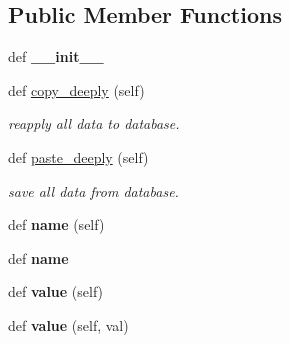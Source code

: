 \subsection*{Public Member Functions}
\begin{DoxyCompactItemize}
\item 
def {\bfseries \+\_\+\+\_\+init\+\_\+\+\_\+}\hypertarget{classplume-creator_1_1src_1_1plume_1_1gui_1_1property_1_1_property_ac6cc8e04a1c280a6d8c0b5bd5d85ffd2}{}\label{classplume-creator_1_1src_1_1plume_1_1gui_1_1property_1_1_property_ac6cc8e04a1c280a6d8c0b5bd5d85ffd2}

\item 
def \hyperlink{classplume-creator_1_1src_1_1plume_1_1gui_1_1property_1_1_property_a7c8a3f629e3c970e5e4df30aafdeaef5}{copy\+\_\+deeply} (self)
\begin{DoxyCompactList}\small\item\em reapply all data to database. \end{DoxyCompactList}\item 
def \hyperlink{classplume-creator_1_1src_1_1plume_1_1gui_1_1property_1_1_property_a37bf77683bc76dfe0d12be2d6a777d05}{paste\+\_\+deeply} (self)
\begin{DoxyCompactList}\small\item\em save all data from database. \end{DoxyCompactList}\item 
def {\bfseries name} (self)\hypertarget{classplume-creator_1_1src_1_1plume_1_1gui_1_1property_1_1_property_a60a052f5984f84af92890f9ad59201fe}{}\label{classplume-creator_1_1src_1_1plume_1_1gui_1_1property_1_1_property_a60a052f5984f84af92890f9ad59201fe}

\item 
def {\bfseries name}\hypertarget{classplume-creator_1_1src_1_1plume_1_1gui_1_1property_1_1_property_a3ab7e93861591ccdeb098ed6c944f674}{}\label{classplume-creator_1_1src_1_1plume_1_1gui_1_1property_1_1_property_a3ab7e93861591ccdeb098ed6c944f674}

\item 
def {\bfseries value} (self)\hypertarget{classplume-creator_1_1src_1_1plume_1_1gui_1_1property_1_1_property_adcb6e7d06fadcd06b3b31046f643ed0c}{}\label{classplume-creator_1_1src_1_1plume_1_1gui_1_1property_1_1_property_adcb6e7d06fadcd06b3b31046f643ed0c}

\item 
def {\bfseries value} (self, val)\hypertarget{classplume-creator_1_1src_1_1plume_1_1gui_1_1property_1_1_property_a157574ac4cba0e6abfc7f7234f8fbb0b}{}\label{classplume-creator_1_1src_1_1plume_1_1gui_1_1property_1_1_property_a157574ac4cba0e6abfc7f7234f8fbb0b}


\end{DoxyCompactItemize}
